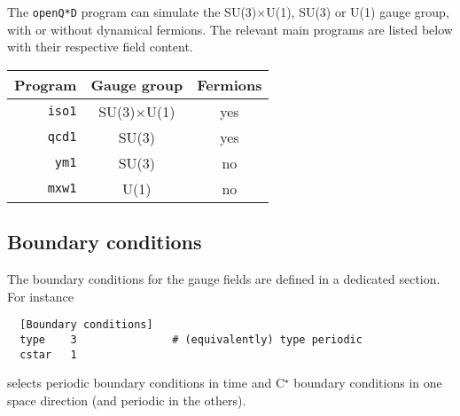 \documentclass[11pt,fleqn]{article}
\begin{document}
The \texttt{openQ*D} program can simulate the SU(3)$\times$U(1), SU(3) or U(1)
gauge group, with or without dynamical fermions. The relevant main programs are
listed below with their respective field content.
%
\begin{center}
\begin{tabular}{r|cc}
  Program & Gauge group & Fermions \\
  \hline
  \hline
  \texttt{iso1} & SU(3)$\times$U(1) & yes \\
  \texttt{qcd1} & SU(3) & yes \\
  \texttt{ym1} & SU(3) & no \\
  \texttt{mxw1} & U(1) & no
\end{tabular}
\end{center}
% 
% 
% 
% 
% 


\subsection{Boundary conditions}
\label{subsec:actions:bc}


The boundary conditions for the gauge fields are defined in a dedicated section.
For instance
%
\begin{verbatim}
  [Boundary conditions]
  type    3               # (equivalently) type periodic
  cstar   1
\end{verbatim}
%
selects periodic boundary conditions in time and C$^\star$ boundary conditions
in one space direction (and periodic in the others).
\end{document}
